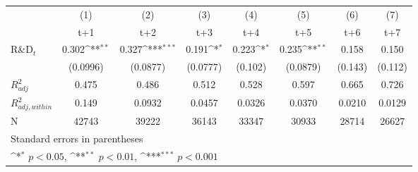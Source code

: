 {
\def\sym#1{\ifmmode^{#1}\else\(^{#1}\)\fi}
\begin{tabular}{l*{7}{c}}
\hline\hline
            &\multicolumn{1}{c}{(1)}&\multicolumn{1}{c}{(2)}&\multicolumn{1}{c}{(3)}&\multicolumn{1}{c}{(4)}&\multicolumn{1}{c}{(5)}&\multicolumn{1}{c}{(6)}&\multicolumn{1}{c}{(7)}\\
            &\multicolumn{1}{c}{t+1}&\multicolumn{1}{c}{t+2}&\multicolumn{1}{c}{t+3}&\multicolumn{1}{c}{t+4}&\multicolumn{1}{c}{t+5}&\multicolumn{1}{c}{t+6}&\multicolumn{1}{c}{t+7}\\
\hline
R\&D$_t$         &       0.302\sym{**} &       0.327\sym{***}&       0.191\sym{*}  &       0.223\sym{*}  &       0.235\sym{**} &       0.158         &       0.150         \\
            &    (0.0996)         &    (0.0877)         &    (0.0777)         &     (0.102)         &    (0.0879)         &     (0.143)         &     (0.112)         \\
\hline
$R^2_{adj}$      &       0.475         &       0.486         &       0.512         &       0.528         &       0.597         &       0.665         &       0.726         \\
$R^2_{adj,within}$ &       0.149         &      0.0932         &      0.0457         &      0.0326         &      0.0370         &      0.0210         &      0.0129         \\
N           &       42743         &       39222         &       36143         &       33347         &       30933         &       28714         &       26627         \\
\hline\hline
\multicolumn{8}{l}{\footnotesize Standard errors in parentheses}\\
\multicolumn{8}{l}{\footnotesize \sym{*} \(p<0.05\), \sym{**} \(p<0.01\), \sym{***} \(p<0.001\)}\\
\end{tabular}
}
